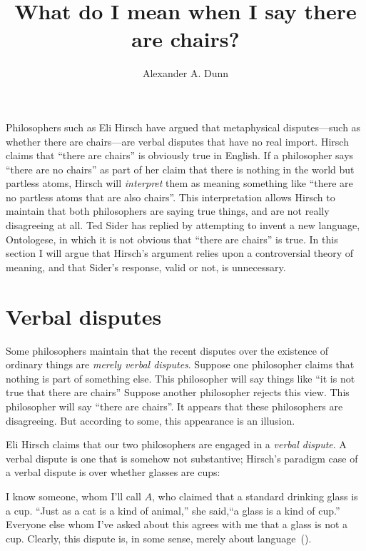 \documentclass[11pt]{article}
\title{What do I mean when I say there are chairs?}
\author{Alexander A. Dunn}
\newenvironment{squote}{%
\begin{spacing}{1}
       	\begin{list}{}{%
\setlength{\labelwidth}{0pt}%
\rightmargin\leftmargin%
}
\item\relax
}{%
\end{list}%
\end{spacing}
}
\begin{document}
\ifstandalone
\maketitle
\begin{spacing}{1.25}
\fi

\label{verbal}
Philosophers such as Eli Hirsch have argued that metaphysical
disputes---such as whether there are chairs---are verbal disputes that
have no real import.  Hirsch claims that ``there are chairs'' is
obviously true in English.  If a philosopher says ``there are no
chairs'' as part of her claim that there is nothing in the world but
partless atoms, Hirsch will {\em interpret} them as meaning something
like ``there are no partless atoms that are also chairs''.  This
interpretation allows Hirsch to maintain that both philosophers are
saying true things, and are not really disagreeing at all.  Ted Sider
has replied by attempting to invent a new language, Ontologese, in
which it is not obvious that ``there are chairs'' is true.  In this
section I will argue that Hirsch's argument relies upon a
controversial theory of meaning, and that Sider's response, valid or
not, is unnecessary.

\section{Verbal disputes}
\label{hirsch}
Some philosophers maintain that the recent disputes over the existence
of ordinary things are {\em merely verbal disputes}.  Suppose one
philosopher claims that nothing is part of something else.  This
philosopher will say things like ``it is not true that there are
chairs'' Suppose another philosopher rejects this view.  This
philosopher will say ``there are chairs''.  It appears that these
philosophers are disagreeing.  But according to some, this appearance
is an illusion.

Eli Hirsch claims that our two philosophers are engaged in a {\em
  verbal dispute}.  A verbal dispute is one that is somehow not
substantive; Hirsch's paradigm case of a verbal dispute is over
whether glasses are cups:

\begin{squote}
  I know someone, whom I'll call $A$, who claimed that a standard
  drinking glass is a cup.  ``Just as a cat is a kind of animal,'' she
  said,``a glass is a kind of cup.''  Everyone else whom I've asked
  about this agrees with me that a glass is not a cup.  Clearly, this
  dispute is, in some sense, merely about
  language~(\citeyear[69]{hirsch2005}).
\end{squote}


\end{spacing}
\end{document}
